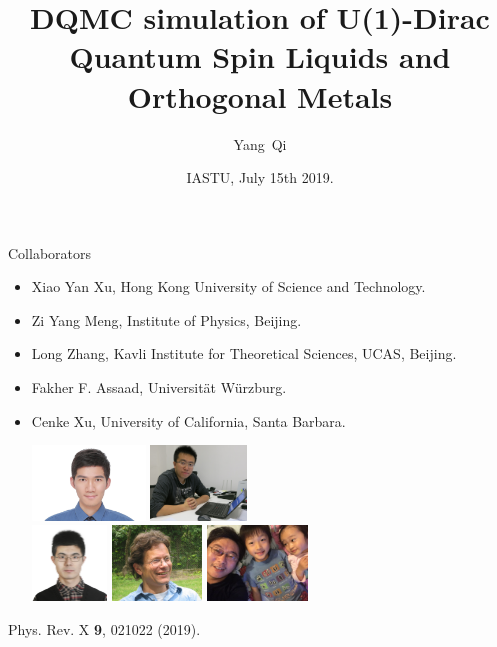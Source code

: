 \documentclass[xcolor=table, 10pt, aspectratio=43]{beamer}
\title[EQMC] %
{DQMC simulation of U(1)-Dirac Quantum Spin Liquids and Orthogonal Metals}
\author[Y Qi] %
{Yang~Qi}
\institute[Fudan] %
{
Department of Physics, Fudan University.
}
\date{IASTU, July 15th 2019.}
\begin{document}
\begin{frame}
  \titlepage
\end{frame}

\begin{frame}{Collaborators}
\begin{itemize}
\item Xiao Yan Xu, Hong Kong University of Science and Technology.
\item Zi Yang Meng, Institute of Physics, Beijing.
\item Long Zhang, Kavli Institute for Theoretical Sciences, UCAS, Beijing.
\item Fakher F. Assaad, Universit\"at W\"urzburg.
\item Cenke Xu, University of California, Santa Barbara.
\begin{center}
  \includegraphics[height=2cm]{../people/xiaoyanxu}
  \includegraphics[height=2cm]{../people/ziyangmeng}\\
  \includegraphics[height=2cm]{../people/zhanglong}
  \includegraphics[height=2cm]{../people/fakher}
  \includegraphics[height=2cm]{../people/cenke}
\end{center}
\end{itemize}
\begin{center}
  \small Phys. Rev. X \textbf{9}, 021022 (2019).
\end{center}
\end{frame}
\end{document}

